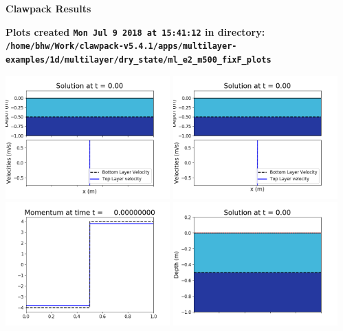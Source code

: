 \documentclass[11pt]{article}
\begin{document}
        \begin{center}{\Large\bf Clawpack Results}\vskip 5pt
        
        \bf Plots created {\tt Mon Jul  9 2018 at 15:41:12} in directory: \vskip 5pt
        \verb+/home/bhw/Work/clawpack-v5.4.1/apps/multilayer-examples/1d/multilayer/dry_state/ml_e2_m500_fixF_plots+
        \end{center}
        \vskip 5pt
        \includegraphics[width=0.475\textwidth]{frame0000fig1001.png}
\includegraphics[width=0.475\textwidth]{frame0000fig1002.png}
\vskip 10pt 
\includegraphics[width=0.475\textwidth]{frame0000fig1003.png}
\includegraphics[width=0.475\textwidth]{frame0000fig1006.png}
\end{document}
